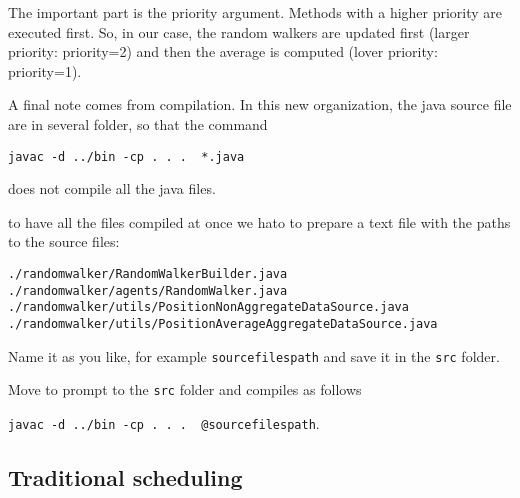 \documentclass{article}
\begin{document}
The important part is the priority argument. Methods with a higher priority are executed first. So, in our case, the random walkers are updated first (larger priority: priority=2) and then the average is computed (lover priority: priority=1). 

A final note comes from compilation. In this new organization, the java source file are in several folder, so that the command 

\verb+javac -d ../bin -cp . . .  *.java+

does not compile all the java files.

to have all the files compiled at once we hato to prepare a text file with the paths to the source files:

\begin{verbatim}
./randomwalker/RandomWalkerBuilder.java
./randomwalker/agents/RandomWalker.java
./randomwalker/utils/PositionNonAggregateDataSource.java
./randomwalker/utils/PositionAverageAggregateDataSource.java
\end{verbatim}

Name it as you like, for example \verb+sourcefilespath+ and save it in the \verb+src+ folder.

Move to prompt to the \verb+src+ folder and compiles as follows

\verb+javac -d ../bin -cp . . .  @sourcefilespath+.




\subsection{Traditional scheduling}
\end{document}
